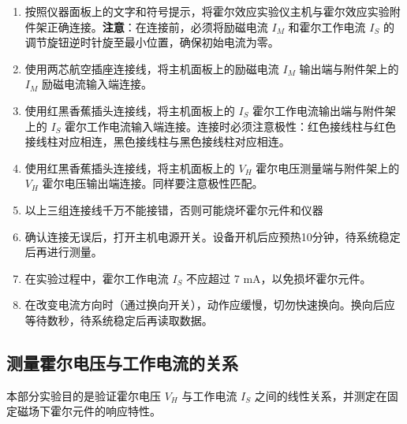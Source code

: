 ﻿\documentclass[12pt,a4paper]{article}
\begin{document}
\begin{enumerate}
    \item 按照仪器面板上的文字和符号提示，将霍尔效应实验仪主机与霍尔效应实验附件架正确连接。\textbf{注意}：在连接前，必须将励磁电流 $I_M$ 和霍尔工作电流 $I_S$ 的调节旋钮逆时针旋至最小位置，确保初始电流为零。
    
    \item 使用两芯航空插座连接线，将主机面板上的励磁电流 $I_M$ 输出端与附件架上的 $I_M$ 励磁电流输入端连接。
    
    \item 使用红黑香蕉插头连接线，将主机面板上的 $I_S$ 霍尔工作电流输出端与附件架上的 $I_S$ 霍尔工作电流输入端连接。连接时必须注意极性：红色接线柱与红色接线柱对应相连，黑色接线柱与黑色接线柱对应相连。
    
    \item 使用红黑香蕉插头连接线，将主机面板上的 $V_H$ 霍尔电压测量端与附件架上的 $V_H$ 霍尔电压输出端连接。同样要注意极性匹配。
    
    \item 以上三组连接线千万不能接错，否则可能烧坏霍尔元件和仪器
    
    \item 确认连接无误后，打开主机电源开关。设备开机后应预热10分钟，待系统稳定后再进行测量。
    
    \item 在实验过程中，霍尔工作电流 $I_S$ 不应超过 7 mA，以免损坏霍尔元件。
    
    \item 在改变电流方向时（通过换向开关），动作应缓慢，切勿快速换向。换向后应等待数秒，待系统稳定后再读取数据。
\end{enumerate}

\subsection{测量霍尔电压与工作电流的关系}

本部分实验目的是验证霍尔电压 $V_H$ 与工作电流 $I_S$ 之间的线性关系，并测定在固定磁场下霍尔元件的响应特性。
\end{document}
